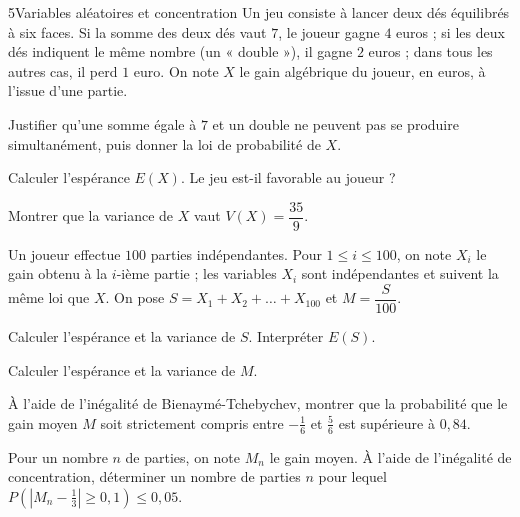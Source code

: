 

\begin{exoBac}{5}{Variables aléatoires et concentration}
Un jeu consiste à lancer deux dés équilibrés à six faces. Si la somme des deux dés vaut $7$, le joueur gagne $4$ euros ; si les deux
dés indiquent le même nombre (un « double »), il gagne $2$ euros ; dans tous les autres cas, il perd $1$ euro. On note $X$ le gain
algébrique du joueur, en euros, à l'issue d'une partie.
\begin{questions}
  \item Justifier qu'une somme égale à $7$ et un double ne peuvent pas se produire simultanément, puis donner la loi de probabilité de $X$.
  \item Calculer l'espérance $E(X)$. Le jeu est-il favorable au joueur ?
  \item Montrer que la variance de $X$ vaut $V(X)=\dfrac{35}{9}$.
\end{questions}
Un joueur effectue $100$ parties indépendantes. Pour $1\leq i\leq100$, on note $X_i$ le gain obtenu à la $i$-ième partie ; les variables
$X_i$ sont indépendantes et suivent la même loi que $X$. On pose $S=X_1+X_2+\dots+X_{100}$ et $M=\dfrac{S}{100}$.
\begin{questions}[resume]
  \item Calculer l'espérance et la variance de $S$. Interpréter $E(S)$.
  \item Calculer l'espérance et la variance de $M$.
  \item À l'aide de l'inégalité de Bienaymé-Tchebychev, montrer que la probabilité que le gain moyen $M$ soit strictement compris entre
    $-\frac16$ et $\frac56$ est supérieure à $0{,}84$.
  \item Pour un nombre $n$ de parties, on note $M_n$ le gain moyen. À l'aide de l'inégalité de concentration, déterminer un nombre de
    parties $n$ pour lequel $P\left(\left|M_n-\frac13\right|\geq0{,}1\right)\leq0{,}05$.
\end{questions}
\end{exoBac}

